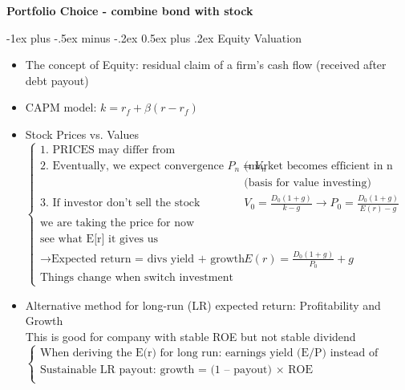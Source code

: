 \documentclass[10pt,landscape]{article}
\makeatletter
\renewcommand{\section}{\@startsection{section}{1}{0mm}%
                                {-1ex plus -.5ex minus -.2ex}%
                                {0.5ex plus .2ex}%
                                {\normalfont\large\bfseries}}
\makeatother
\begin{document}
\newpage
    \begin{center}
         \Large{\textbf{Portfolio Choice - combine bond with stock}} \\
    \end{center}

    \begin{multicols}{2}
	\setlength{\premulticols}{1pt}
	\setlength{\postmulticols}{1pt}
	\setlength{\multicolsep}{1pt}
	\setlength{\columnsep}{2pt}

    \section{Equity Valuation}
    \begin{itemize}
        \item The concept of {\color{red}Equity}: residual claim of a firm's cash flow (received after debt payout)
        \item CAPM model: $k = r_f +\beta(r-r_f)$ 
        \item Stock Prices vs. Values \\
        	$
            \begin{cases}
                \text{1. PRICES may differ from fundamental VALUES}\\
                \text{2. Eventually, we expect convergence $P_n = V_n$}& \text{(market becomes efficient in n years)}\\
                \text{}& \text{(basis for value investing)}\\
                \text{3. If investor don't sell the stock} & \displaystyle V_0=\frac{D_0(1+g)}{k-g} \rightarrow \displaystyle P_0=\frac{D_0(1+g)}{E(r)-g}\\
                \text{we are taking the price for now}\\
                \text{see what E[r] it gives us}\\
                \rightarrow \text{Expected return = divs yield + growth in divs} & \displaystyle E(r)=\frac{D_0(1+g)}{P_0}+g\\
                \text{Things change when switch investment horizon}
            \end{cases}
            $
        \item Alternative method for long-run (LR) expected return: Profitability and Growth\\
            This is good for company with stable ROE but not stable dividend\\
            $
            \begin{cases}
                \text{When deriving the E(r) for long run: earnings yield (E/P) instead of dividend yield (D/P)}\\
                \text{Sustainable LR payout: growth = (1 – payout) $\times$ ROE }\\
            \end{cases}
            $
    \end{itemize}


\end{multicols}
\end{document}
